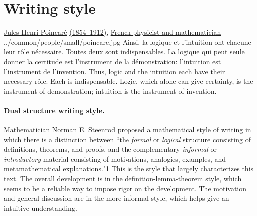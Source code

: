 \section*{Writing style}
\qboxnpqt
  { %
    \href{http://en.wikipedia.org/wiki/Henri_Poincar\%C3\%A9}{Jules Henri Poincar\'e}
    \href{http://www-history.mcs.st-andrews.ac.uk/Timelines/TimelineF.html}{(1854--1912)},
    \href{http://www-history.mcs.st-andrews.ac.uk/BirthplaceMaps/Places/France.html}{French physicist and mathematician}
    \footnotemark
  }
  {../common/people/small/poincare.jpg}
  {Ainsi, la logique et l'intuition ont chacune leur r\^ole n\'ecessaire.
    Toutes deux sont indispensables.
    La logique qui peut seule donner la certitude est l'instrument de la d\'emonstration:
    l'intuition est l'instrument de l'invention.}
  {Thus, logic and the intuition each have their necessary r\^ole.
    Each is indispensable.
    Logic, which alone can give certainty, is the instrument of demonstration;
    intuition is the instrument of invention.}

  \paragraph{Dual structure writing style.}
  Mathematician \href{http://en.wikipedia.org/wiki/Steenrod}{Norman E. Steenrod}
  proposed a mathematical style of writing
  in which there is a distinction between
  ``the {\em formal} or {\em logical} structure consisting of definitions, theorems,
  and proofs, and the complementary
  {\em informal} or {\em introductory} material consisting of motivations, analogies,
  examples, and metamathematical explanations."\citep{steenrod}{1}
  This is the style that largely characterizes this text.
  The overall development is in the definition-lemma-theorem style,
  which seems to be a reliable way to impose rigor on the development.
  The motivation and general discussion are in the more informal style,
  which helps give an intuitive understanding.


